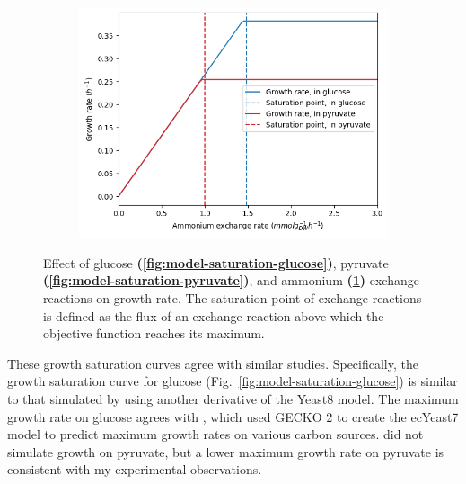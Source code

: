 \begin{figure}
  \begin{subfigure}[t]{0.45\textwidth}
  \centering
    \includegraphics[width=\linewidth]{saturation_amm}
    \caption{
    }
    \label{fig:model-saturation-ammonium}
  \end{subfigure}

  \caption[
    Effect of exchange reactions on growth rate
  ]{
    Effect of glucose \textbf{(\ref{fig:model-saturation-glucose})}, pyruvate \textbf{(\ref{fig:model-saturation-pyruvate})}, and ammonium \textbf{(\ref{fig:model-saturation-ammonium})} exchange reactions on growth rate.
    The saturation point of exchange reactions is defined as the flux of an exchange reaction above which the objective function reaches its maximum.
  }
  \label{fig:model-saturation}
\end{figure}

These growth saturation curves agree with similar studies.
Specifically, the growth saturation curve for glucose (Fig.\ \ref{fig:model-saturation-glucose}) is similar to that simulated by \textcite{elsemmanWholecellModelingYeast2022} using another derivative of the Yeast8 model.
The maximum growth rate on glucose agrees with \textcite{domenzainReconstructionCatalogueGenomescale2022}, which used GECKO 2 to create the ecYeast7 model to predict maximum growth rates on various carbon sources.
\textcite{domenzainReconstructionCatalogueGenomescale2022} did not simulate growth on pyruvate, but a lower maximum growth rate on pyruvate is consistent with my experimental observations.


